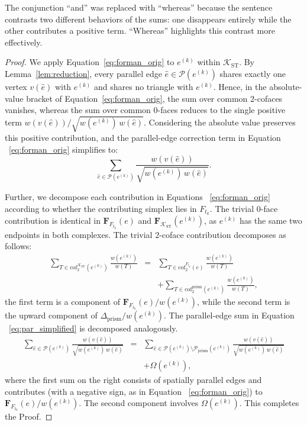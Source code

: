 \documentclass[
    pre,
    twocolumn,
    superscriptaddress,
    showpacs,
    nofootinbib,
    amsmath,
    amssymb,
    floatfix
]{revtex4-2}
\newcommand{\K}{\mathcal{K}}
\newcommand{\F}{\mathbf{F}}        %
\theoremstyle{plain} %
\theoremstyle{definition} %
\begin{document}
The conjunction “and” was replaced with “whereas” because the sentence contrasts two different behaviors of the sums: one disappears entirely while the other contributes a positive term. “Whereas” highlights this contrast more effectively.\begin{proof}
We apply Equation~\eqref{eq:forman_orig} to $e^{(k)}$ within $\K_{\mathrm{ST}}$.
By Lemma~\ref{lem:reduction}, every parallel edge $\hat e \in \mathcal{P}(e^{(k)})$ shares exactly one vertex $v(\hat e)$ with $e^{(k)}$ and shares no triangle with $e^{(k)}$.
Hence, in the absolute-value bracket of Equation~\eqref{eq:forman_orig}, the sum over common $2$-cofaces vanishes, whereas the sum over common $0$-faces reduces to the single positive term $w(v(\hat e))/\sqrt{w(e^{(k)})\,w(\hat e)}$.
Considering the absolute value preserves this positive contribution, and the parallel-edge correction term in Equation ~\eqref{eq:forman_orig} simplifies to:
\begin{equation}\label{eq:par_simplified}
\sum_{\hat e\in\mathcal{P}(e^{(k)})} \frac{w(v(\hat e))}{\sqrt{w(e^{(k)})\,w(\hat e)}}.
\end{equation}

Further, we decompose each contribution in Equations ~\eqref{eq:forman_orig} according to whether the contributing simplex lies in $F_{t_k}$.
The trivial $0$-face contribution is identical in $\F_{F_{t_k}}(e)$ and $\F_{\K_{\mathrm{ST}}}(e^{(k)})$, as $e^{(k)}$ has the same two endpoints in both complexes.
The trivial $2$-coface contribution decomposes as follows:
\begin{eqnarray*}
\sum_{T \in \mathrm{cof}_2^{\K_{\mathrm{ST}}}(e^{(k)})}\!\frac{w(e^{(k)})}{w(T)}
&=&
\sum_{T \in \mathrm{cof}_2^{F_{t_k}}(e)}\!\frac{w(e^{(k)})}{w(T)}\\
&\ &+ \sum_{T \in \mathrm{cof}_2^{\mathrm{prism}}(e^{(k)})}\!\frac{w(e^{(k)})}{w(T)},
\end{eqnarray*}
the first term is a component of $\F_{F_{t_k}}(e)/w(e^{(k)})$, while the second term is the upward component of $\Delta_{\mathrm{prism}}/w(e^{(k)})$.
The parallel-edge sum in Equation ~\eqref{eq:par_simplified} is decomposed analogously.
\footnotesize
\begin{eqnarray*}
\sum_{\hat e \in \mathcal{P}(e^{(k)})} \frac{w(v(\hat e))}{\sqrt{w(e^{(k)})\,w(\hat e)}}
&=&
\sum_{\hat e \in \mathcal{P}(e^{(k)}) \setminus \mathcal{P}_{\mathrm{prism}}(e^{(k)})} \frac{w(v(\hat e))}{\sqrt{w(e^{(k)})\,w(\hat e)}}\\
&\ &+ \Omega(e^{(k)}),
\end{eqnarray*}
\normalsize
where the first sum on the right consists of spatially parallel edges and contributes (with a negative sign, as in Equation ~\eqref{eq:forman_orig}) to $\F_{F_{t_k}}(e)/w(e^{(k)})$. The second component involves $\Omega(e^{(k)})$.
This completes the Proof.
\end{proof}
\end{document}
